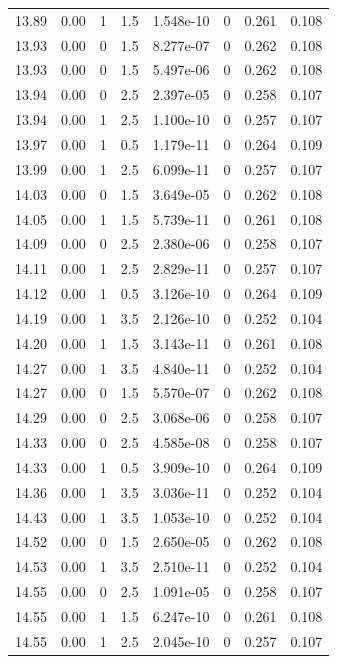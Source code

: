 \documentclass[preview]{standalone}
\begin{document}
{{{{{{{{{{{\begin{tabular}{L{1.2cm}C{1.2cm} C{0.3cm}C{0.5cm} C{1.4cm}C{1.4cm} C{1.4cm}C{1.4cm}}
  13.89  &  0.00  & 1     & 1.5 &  1.548e-10  & 0  & 0.261 &  0.108   \\ 
  13.93  &  0.00  & 0     & 1.5 &  8.277e-07  & 0  & 0.262 &  0.108   \\ 
  13.93  &  0.00  & 0     & 1.5 &  5.497e-06  & 0  & 0.262 &  0.108   \\ 
  13.94  &  0.00  & 0     & 2.5 &  2.397e-05  & 0  & 0.258 &  0.107   \\ 
  13.94  &  0.00  & 1     & 2.5 &  1.100e-10  & 0  & 0.257 &  0.107   \\ 
  13.97  &  0.00  & 1     & 0.5 &  1.179e-11  & 0  & 0.264 &  0.109   \\ 
  13.99  &  0.00  & 1     & 2.5 &  6.099e-11  & 0  & 0.257 &  0.107   \\ 
  14.03  &  0.00  & 0     & 1.5 &  3.649e-05  & 0  & 0.262 &  0.108   \\ 
  14.05  &  0.00  & 1     & 1.5 &  5.739e-11  & 0  & 0.261 &  0.108   \\ 
  14.09  &  0.00  & 0     & 2.5 &  2.380e-06  & 0  & 0.258 &  0.107   \\ 
  14.11  &  0.00  & 1     & 2.5 &  2.829e-11  & 0  & 0.257 &  0.107   \\ 
  14.12  &  0.00  & 1     & 0.5 &  3.126e-10  & 0  & 0.264 &  0.109   \\ 
  14.19  &  0.00  & 1     & 3.5 &  2.126e-10  & 0  & 0.252 &  0.104   \\ 
  14.20  &  0.00  & 1     & 1.5 &  3.143e-11  & 0  & 0.261 &  0.108   \\ 
  14.27  &  0.00  & 1     & 3.5 &  4.840e-11  & 0  & 0.252 &  0.104   \\ 
  14.27  &  0.00  & 0     & 1.5 &  5.570e-07  & 0  & 0.262 &  0.108   \\ 
  14.29  &  0.00  & 0     & 2.5 &  3.068e-06  & 0  & 0.258 &  0.107   \\ 
  14.33  &  0.00  & 0     & 2.5 &  4.585e-08  & 0  & 0.258 &  0.107   \\ 
  14.33  &  0.00  & 1     & 0.5 &  3.909e-10  & 0  & 0.264 &  0.109   \\ 
  14.36  &  0.00  & 1     & 3.5 &  3.036e-11  & 0  & 0.252 &  0.104   \\ 
  14.43  &  0.00  & 1     & 3.5 &  1.053e-10  & 0  & 0.252 &  0.104   \\ 
  14.52  &  0.00  & 0     & 1.5 &  2.650e-05  & 0  & 0.262 &  0.108   \\ 
  14.53  &  0.00  & 1     & 3.5 &  2.510e-11  & 0  & 0.252 &  0.104   \\ 
  14.55  &  0.00  & 0     & 2.5 &  1.091e-05  & 0  & 0.258 &  0.107   \\ 
  14.55  &  0.00  & 1     & 1.5 &  6.247e-10  & 0  & 0.261 &  0.108   \\ 
  14.55  &  0.00  & 1     & 2.5 &  2.045e-10  & 0  & 0.257 &  0.107   \\ 
\hline 
\end{tabular} 

}}}}}}}}}}}
\end{document}
